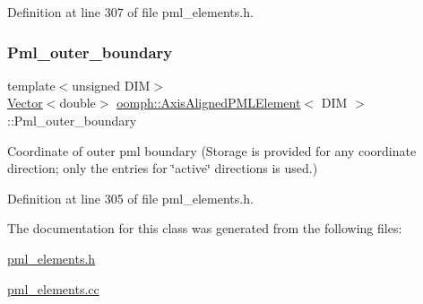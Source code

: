 Definition at line 307 of file pml\+\_\+elements.\+h.

\mbox{\label{classoomph_1_1AxisAlignedPMLElement_aff04e9e225d24b9ce877204b7ae22921}} 
\subsubsection{\texorpdfstring{Pml\+\_\+outer\+\_\+boundary}{Pml\_outer\_boundary}}
{\footnotesize\ttfamily template$<$unsigned D\+IM$>$ \\
\hyperlink{classoomph_1_1Vector}{Vector}$<$double$>$ \hyperlink{classoomph_1_1AxisAlignedPMLElement}{oomph\+::\+Axis\+Aligned\+P\+M\+L\+Element}$<$ D\+IM $>$\+::Pml\+\_\+outer\+\_\+boundary\hspace{0.3cm}{\ttfamily [protected]}}



Coordinate of outer pml boundary (Storage is provided for any coordinate direction; only the entries for \char`\"{}active\char`\"{} directions is used.) 



Definition at line 305 of file pml\+\_\+elements.\+h.



The documentation for this class was generated from the following files\+:\begin{DoxyCompactItemize}
\item 
\hyperlink{pml__elements_8h}{pml\+\_\+elements.\+h}\item 
\hyperlink{pml__elements_8cc}{pml\+\_\+elements.\+cc}\end{DoxyCompactItemize}
